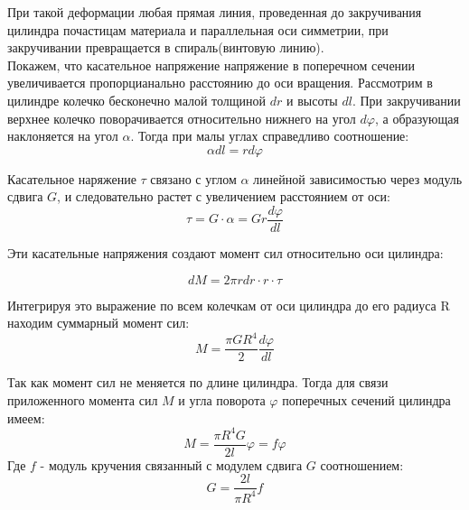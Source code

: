\documentclass[a4paper,12pt]{article}
\begin{document}
При такой деформации любая прямая линия, проведенная до закручивания цилиндра почастицам материала и параллельная оси симметрии,
при закручивании превращается в спираль(винтовую линию). \\

Покажем, что касательное напряжение напряжение в поперечном сечении увеличивается пропорцианально
 расстоянию до оси вращения.
Рассмотрим в цилиндре колечко бесконечно малой толщиной $dr$ и высоты $dl$. При закручивании верхнее колечко поворачивается относительно 
нижнего на угол $d\varphi$, а образующая наклоняется на угол $\alpha$. Тогда при малы углах справедливо соотношение:
\begin{equation}
    \alpha dl= r d\varphi 
\end{equation}

Касательное наряжение $\tau $ связано с углом $\alpha$ линейной зависимостью через модуль сдвига $G$,
 и следовательно растет с увеличением расстоянием от оси:
\begin{equation}
    \tau = G\cdot \alpha =Gr\frac{d\varphi}{dl} 
\end{equation}

Эти касательные напряжения создают момент сил относительно оси цилиндра:

\begin{equation}
    dM=2\pi r dr \cdot r\cdot \tau  
\end{equation}

Интегрируя это выражение по всем колечкам от оси цилиндра до его радиуса R находим суммарный
момент сил:
\begin{equation}
    M = \frac{\pi G R^{4}}{2} \frac{d \varphi }{d l} 
\end{equation}

Так как момент сил не меняется по длине цилиндра. Тогда для связи приложенного
момента сил $M$ и угла поворота $\varphi$ поперечных сечений цилиндра имеем:
\begin{equation}
    M=\frac{\pi R^{4}G}{2l}\varphi=f \varphi
\end{equation}
Где $f$ - модуль кручения связанный с модулем сдвига $G$ соотношением:
\begin{equation}\label{sdvig}
    G=\frac{2l}{\pi R^{4}}f
\end{equation}
\end{document}
